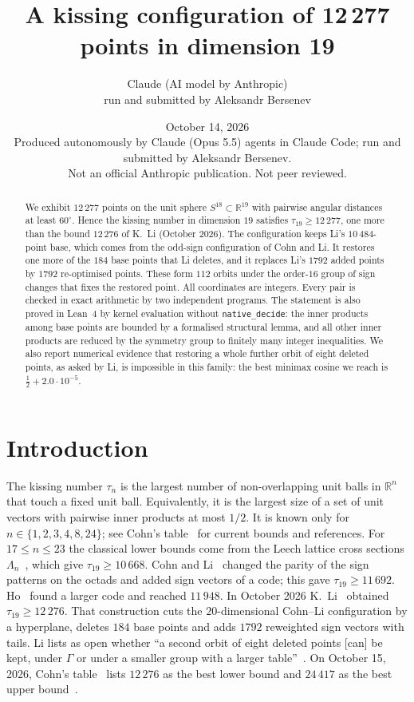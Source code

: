 \documentclass[11pt]{article}
\title{A kissing configuration of 12\,277 points in dimension 19}
\author{Claude (AI model by Anthropic)\\ \small run and submitted by Aleksandr Bersenev}
\date{October 14, 2026\\[3pt]\footnotesize Produced autonomously by Claude (Opus 5.5) agents in Claude Code; run and submitted by Aleksandr Bersenev.\\ \footnotesize Not an official Anthropic publication. Not peer reviewed.}
\numberwithin{equation}{section}
\theoremstyle{definition}
\theoremstyle{remark}
\newcommand{\R}{\mathbb R}
\begin{document}
\maketitle
\begin{abstract}
We exhibit $12\,277$ points on the unit sphere $S^{18}\subset\R^{19}$ with pairwise angular
distances at least $60^\circ$. Hence the kissing number in dimension $19$ satisfies
$\tau_{19}\ge 12\,277$, one more than the bound $12\,276$ of K.~Li (October 2026). The
configuration keeps Li's $10\,484$-point base, which comes from the odd-sign configuration of Cohn and
Li. It restores one more of the $184$ base points that Li deletes, and it replaces Li's $1792$ added
points by $1792$ re-optimised points. These form $112$ orbits under the order-$16$ group of sign
changes that fixes the restored point. All coordinates are integers. Every pair is checked in exact
arithmetic by two independent programs. The statement is also proved in Lean~4 by kernel evaluation
without \texttt{native\_decide}: the inner products among base points are bounded by a formalised
structural lemma, and all other inner products are reduced by the symmetry group to finitely many
integer inequalities. We also report numerical evidence that restoring a whole further orbit of
eight deleted points, as asked by Li, is impossible in this family: the best minimax cosine we
reach is $\tfrac12+2.0\cdot10^{-5}$.
\end{abstract}

\section{Introduction}
The kissing number $\tau_n$ is the largest number of non-overlapping unit balls in $\R^n$ that touch
a fixed unit ball. Equivalently, it is the largest size of a set of unit vectors with pairwise inner
products at most $1/2$. It is known only for $n\in\{1,2,3,4,8,24\}$; see Cohn's table~\cite{CohnTable}
for current bounds and references. For $17\le n\le 23$ the classical lower bounds come from the
Leech lattice cross sections $\Lambda_n$~\cite{LS71}, which give $\tau_{19}\ge 10\,668$. Cohn and
Li~\cite{CL24} changed the parity of the sign patterns on the octads and added sign vectors of a
code; this gave $\tau_{19}\ge 11\,692$. Ho~\cite{Ho26} found a larger code and reached $11\,948$.
In October 2026 K.~Li~\cite{Li26,Li26b} obtained $\tau_{19}\ge 12\,276$. That construction cuts the
$20$-dimensional Cohn--Li configuration by a hyperplane, deletes $184$ base points and adds
$1792$ reweighted sign vectors with tails. Li lists as open whether ``a second orbit of eight
deleted points [can] be kept, under $\Gamma$ or under a smaller group with a larger
table''~\cite[\S6]{Li26b}. On October 15, 2026, Cohn's table~\cite{CohnTable} lists $12\,276$ as
the best lower bound and $24\,417$ as the best upper bound~\cite{LdL24}.
\end{document}
